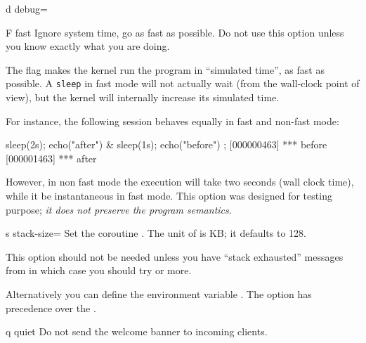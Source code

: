 \begin{options}[Tuning]
\item[d]{debug=} \optionDebug
\item[F]{fast}
  Ignore system time, go as fast as possible.  Do not use this option
  unless you know exactly what you are doing.

  The  flag makes the kernel run the program in
  ``simulated time'', as fast as possible. A \lstinline|sleep| in fast
  mode will not actually wait (from the wall-clock point of view), but
  the kernel will internally increase its simulated time.

  For instance, the following session behaves equally in fast and
  non-fast mode:

\begin{urbiscript}[firstnumber=1]
{ sleep(2s); echo("after") } & { sleep(1s); echo("before") };
[000000463] *** before
[000001463] *** after
\end{urbiscript}

  \noindent
  However, in non fast mode the execution will take two seconds (wall
  clock time), while it be instantaneous in fast mode. This option was
  designed for testing purpose; \emph{it does not preserve the program
    semantics}.

\item[s]{stack-size=} Set the coroutine .
  The unit of  is KB; it defaults to 128.

  This option should not be needed unless you have ``stack exhausted''
  messages from  in which case you should try
   or more.

  Alternatively you can define the environment variable
  .  The option  has
  precedence over the .

\item[q]{quiet} Do not send the welcome banner to incoming clients.
\end{options}

